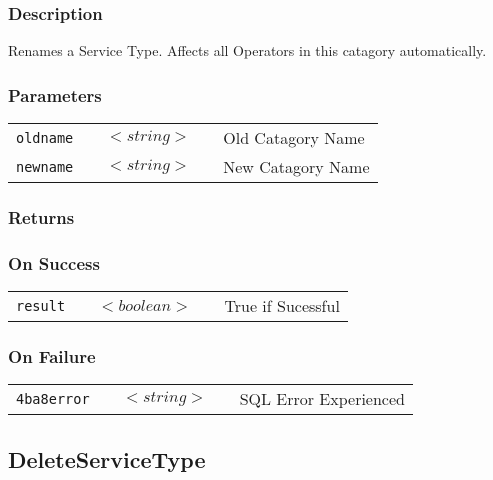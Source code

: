 \subsubsection{Description}

Renames a Service Type. Affects all Operators in this catagory
automatically. 

\subsubsection{Parameters}

\begin{tabular}{lllll}
\verb!oldname! & \hspace{15mm} & $<string>$ & \hspace{15mm} & Old Catagory Name \\
\verb!newname! & \hspace{15mm} & $<string>$ & \hspace{15mm} & New Catagory Name \\
\end{tabular}

\subsubsection{Returns}

\subsubsection{On Success}

\begin{tabular}{lllll}
\verb!result! & \hspace{15mm} & $<boolean>$ & \hspace{15mm} & True if Sucessful \\
\end{tabular}

\subsubsection{On Failure}

\begin{tabular}{lllll}
\verb!4ba8error! & \hspace{15mm} & $<string>$ & \hspace{15mm} & SQL Error Experienced \\
\end{tabular}


\subsection{DeleteServiceType}

